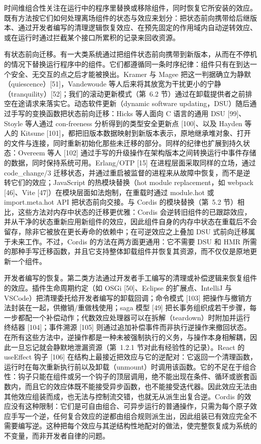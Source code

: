 \documentclass[
  10
]{article}
\begin{document}
时间维组合性关注在运行中的程序里替换或移除组件，同时恢复它所安装的效应。既有方法按它们如何处理离场组件的状态与效应来划分：把状态前向携带给后继版本、通过开发者编写的清理逻辑恢复效应、在预先固定的作用域内自动逆转效应、或在运行时通过拦截某个接口所累积的记录来回收资源。

有状态前向迁移。有一大类系统通过把组件状态前向携带到新版本，从而在不停机的情况下替换运行程序中的组件。它们都遵循同一条时序纪律：组件只有在到达一个安全、无交互的点之后才能被换出。Kramer 与 Magee 把这一判据确立为静默（quiescence）{[}51{]}，Vandewoude 等人后来将其放宽为干扰更小的宁静（tranquility）{[}52{]}；我们的滚动更新模式（第~6.2 节）通过在卸载提供者之前排空在途请求来落实它。动态软件更新（dynamic software updating，DSU）随后通过手写的变换函数把状态前向迁移：Hicks 等人面向 C 语言的通用 DSU {[}99{]}、Stoyle 等人通过 con-freeness 分析得到的类型安全更新点 {[}100{]}、以及 Hayden 等人的 Kitsune {[}101{]}，都把旧版本数据映射到新版本表示，原地继承堆对象、打开的文件与连接，同时重新初始化那些未迁移的部分。同样的纪律也扩展到持久状态：Overeem 等人 {[}102{]} 通过手写的升级操作在架构版本之间转换运行中事件存储的数据，同时保持系统可用。Erlang/OTP {[}15{]} 在进程层面采取同样的立场，通过 code\_change/3 迁移状态，并通过重启被监督的进程来从故障中恢复，而不是逆转它们的效应；JavaScript 的热模块替换（hot module replacement，如 webpack {[}46{]}、Vite {[}47{]}）在模块层面如法炮制，在重载时通过 module.hot 或 import.meta.hot API 把状态前向交接。与 Cordis 的模块替换（第~5.2 节）相比，这些方法对内存中状态的迁移更优雅：Cordis 会逆转旧组件的已跟踪效应，并从干净的状态重新应用新组件的效应，因此组件自身的内存中状态在重载后不会留存，除非它被放在更长寿命的依赖中；在可逆效应之上叠加 DSU 式前向迁移属于未来工作。不过，Cordis 的方法在两方面更通用：它不需要 DSU 和 HMR 所需的那种手写迁移函数，并且它支持整体卸载组件并恢复其资源，而不仅仅是原地更新一个组件。

开发者编写的恢复。第二类方法通过开发者手工编写的清理或补偿逻辑来恢复组件的效应。插件生命周期约定（如 OSGi {[}50{]}、Eclipse 的扩展点、IntelliJ 与 VSCode）把清理委托给开发者编写的卸载回调；命令模式 {[}103{]} 把操作与撤销方法封装在一起，供撤销/重做栈使用；saga 模型 {[}49{]} 把长事务组织成若干步骤，每一步都配一个补偿动作；代数效应处理器可以在拆解（teardown）时附加并运行终结器 {[}104{]}；事件溯源 {[}105{]} 则通过追加补偿事件而非执行逆操作来撤回状态。在所有这些方法中，逆操作都是一种未被强制执行的义务，与操作本身相解耦，因此一旦忘记就会静默地泄漏资源（第~1.2.1 节对此有经验性的记录）。React 的 useEffect 钩子 {[}106{]} 在结构上最接近把效应与它的逆配对：它返回一个清理函数，运行时在每次重新执行前以及卸载（unmount）时调用该函数。它的不足在于组合性：钩子只能在组件或另一个钩子的顶层调用，绝不能出现在条件、循环或嵌套函数内，而且它的效应体既不能接受异步函数，也不能接受迭代器。因此效应无法由其他效应组装而成，也无法与控制流交错，也就无从派生出复合逆。Cordis 的效应没有这种限制：它们是可自由组合、可异步运行的普通操作，只需为每个原子效应手写一个逆，任何复合效应的逆都由组合规则派生出，因此组装已有效应完全不需要编写逆。这种把每个效应与其逆结构性地配对的做法，使完整恢复成为系统的不变量，而非开发者自律的问题。
\end{document}
